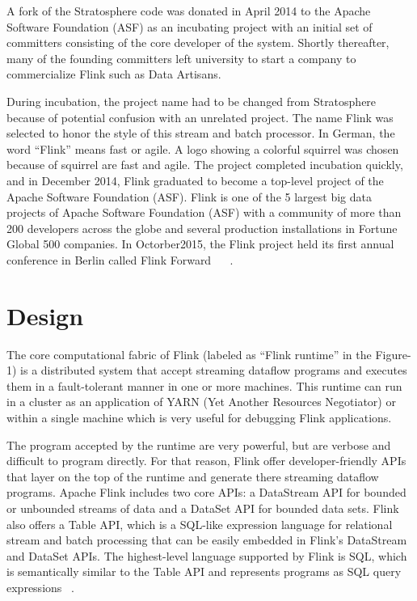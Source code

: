 \documentclass[9pt,twocolumn,twoside]{styles/osajnl}
\begin{document}
A fork of the Stratosphere code was donated in April 2014 to the Apache Software Foundation (ASF) as an incubating project with an initial set of committers consisting of the core developer of the system. Shortly thereafter, many of the founding committers left university to start  a company to commercialize Flink such as Data Artisans.

During incubation, the project name had to be changed from Stratosphere because of potential confusion with an unrelated project. The name Flink was selected to honor the style of this stream and batch processor. In German, the word “Flink” means fast or agile. A logo showing a colorful squirrel was chosen because of squirrel are fast and agile. The project completed incubation quickly, and in December 2014, Flink graduated to become a top-level project of the Apache Software Foundation (ASF). Flink is one of the 5 largest big data projects of Apache Software Foundation (ASF) with a community of more than 200 developers across the globe and several production installations in Fortune Global 500 companies.  In Octorber2015, the Flink project held its first annual conference in Berlin called Flink Forward ~\cite{wiki-flink} ~\cite{book-flink}.

\section{Design}
The core computational fabric of Flink  (labeled as “Flink runtime” in the Figure-1) is a distributed system that accept streaming dataflow programs and executes them in a fault-tolerant manner in one or more machines. This runtime can run in a cluster as an application of YARN (Yet Another Resources Negotiator) or within a single machine which is very useful for debugging Flink applications.

The program accepted by the runtime are very powerful, but are verbose and difficult to program directly. For that reason, Flink offer developer-friendly APIs that layer on the top of the runtime and generate there streaming dataflow programs. Apache Flink includes two core APIs: a DataStream API for bounded or unbounded streams of data and a DataSet API for bounded data sets. Flink also offers a Table API, which is a SQL-like expression language for relational stream and batch processing that can be easily embedded in Flink’s DataStream and DataSet APIs. The highest-level language supported by Flink is SQL, which is semantically similar to the Table API and represents programs as SQL query expressions ~\cite{www-flink}.
\end{document}

